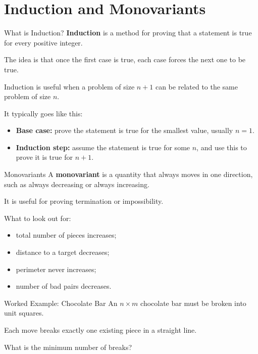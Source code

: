 \documentclass{beamer}
\begin{document}
\section{Induction and Monovariants}

\begin{frame}{What is Induction?}
    \pause
    \textbf{Induction} is a method for proving that a
    statement is true for every positive integer.

    The idea is that once the first case is true, each case forces
    the next one to be true.

    Induction is useful when a problem of size $n+1$ can be related
    to the same problem of size $n$.

    It typically goes like this:
    \pause
    \begin{itemize}
        \item \textbf{Base case:} prove the statement is true for the
            smallest value, usually $n=1$.
        \item \textbf{Induction step:} assume the statement is true
            for some $n$, and use this to prove it is true for $n+1$.
    \end{itemize}
\end{frame}

\begin{frame}{Monovariants}
    \pause
    A \textbf{monovariant} is a quantity that always moves in one
    direction, such as always decreasing or always increasing.

    It is useful for proving termination or impossibility.

    What to look out for:
    \pause
    \begin{itemize}
        \item total number of pieces increases;
        \item distance to a target decreases;
        \item perimeter never increases;
        \item number of bad pairs decreases.
    \end{itemize}
\end{frame}

\begin{frame}{Worked Example: Chocolate Bar}
    An $n\times m$ chocolate bar must be broken into unit squares.

    Each move breaks exactly one existing piece in a straight line.

    What is the minimum number of breaks?
\end{frame}
\end{document}
